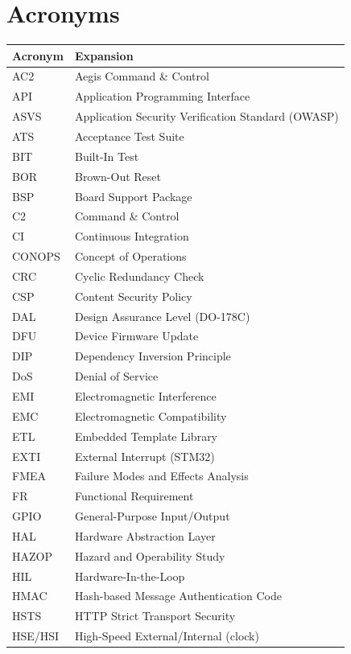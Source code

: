 \section{Acronyms}

\begin{tabularx}{\textwidth}{|l|X|}
\hline
\textbf{Acronym} & \textbf{Expansion} \\
\hline
AC2   & Aegis Command \& Control \\
API   & Application Programming Interface \\
ASVS  & Application Security Verification Standard (OWASP) \\
ATS   & Acceptance Test Suite \\
BIT   & Built-In Test \\
BOR   & Brown-Out Reset \\
BSP   & Board Support Package \\
C2    & Command \& Control \\
CI    & Continuous Integration \\
CONOPS & Concept of Operations \\
CRC   & Cyclic Redundancy Check \\
CSP   & Content Security Policy \\
DAL   & Design Assurance Level (DO-178C) \\
DFU   & Device Firmware Update \\
DIP   & Dependency Inversion Principle \\
DoS   & Denial of Service \\
EMI   & Electromagnetic Interference \\
EMC   & Electromagnetic Compatibility \\
ETL   & Embedded Template Library \\
EXTI  & External Interrupt (STM32) \\
FMEA  & Failure Modes and Effects Analysis \\
FR    & Functional Requirement \\
GPIO  & General-Purpose Input/Output \\
HAL   & Hardware Abstraction Layer \\
HAZOP & Hazard and Operability Study \\
HIL   & Hardware-In-the-Loop \\
HMAC  & Hash-based Message Authentication Code \\
HSTS  & HTTP Strict Transport Security \\
HSE/HSI & High-Speed External/Internal (clock) \\

\end{tabularx}
